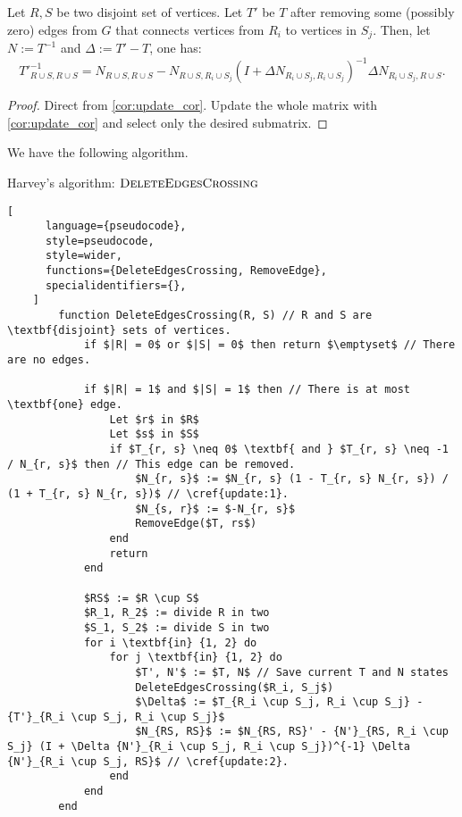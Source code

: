 \begin{theorem}[Update 2]
\label{update:2}
    Let \(R, S\) be two disjoint set of vertices. Let \(T'\) be \(T\) after removing some (possibly zero) edges from \(G\) that connects vertices from \(R_i\) to vertices in \(S_j\).
    Then, let \(N := T^{-1}\) and \(\Delta := T' - T\), one has:
    \[
        {T'}^{-1}_{R \cup S, R \cup S} = N_{R \cup S, R \cup S} - N_{R \cup S, R_i \cup S_j}(I + \Delta N_{R_i \cup S_j, R_i \cup S_j})^{-1} \Delta N_{R_i \cup S_j, R \cup S}.
    \]
\end{theorem}

\begin{proof}
    Direct from \cref{cor:update_cor}. Update the whole matrix with \ref{cor:update_cor} and select only the desired submatrix.
\end{proof}

We have the following algorithm.

\begin{programruledcaption}{Harvey's algorithm: \(\textsc{DeleteEdgesCrossing}\)}
    \begin{lstlisting}[
      language={pseudocode},
      style=pseudocode,
      style=wider,
      functions={DeleteEdgesCrossing, RemoveEdge},
      specialidentifiers={},
    ]
        function DeleteEdgesCrossing(R, S) // R and S are \textbf{disjoint} sets of vertices.
            if $|R| = 0$ or $|S| = 0$ then return $\emptyset$ // There are no edges.

            if $|R| = 1$ and $|S| = 1$ then // There is at most \textbf{one} edge.
                Let $r$ in $R$
                Let $s$ in $S$
                if $T_{r, s} \neq 0$ \textbf{ and } $T_{r, s} \neq -1 / N_{r, s}$ then // This edge can be removed.
                    $N_{r, s}$ := $N_{r, s} (1 - T_{r, s} N_{r, s}) / (1 + T_{r, s} N_{r, s})$ // \cref{update:1}.
                    $N_{s, r}$ := $-N_{r, s}$
                    RemoveEdge($T, rs$)
                end
                return
            end

            $RS$ := $R \cup S$
            $R_1, R_2$ := divide R in two 
            $S_1, S_2$ := divide S in two
            for i \textbf{in} {1, 2} do
                for j \textbf{in} {1, 2} do
                    $T', N'$ := $T, N$ // Save current T and N states
                    DeleteEdgesCrossing($R_i, S_j$)
                    $\Delta$ := $T_{R_i \cup S_j, R_i \cup S_j} - {T'}_{R_i \cup S_j, R_i \cup S_j}$
                    $N_{RS, RS}$ := $N_{RS, RS}' - {N'}_{RS, R_i \cup S_j} (I + \Delta {N'}_{R_i \cup S_j, R_i \cup S_j})^{-1} \Delta {N'}_{R_i \cup S_j, RS}$ // \cref{update:2}.
                end
            end
        end
    \end{lstlisting}
\end{programruledcaption}

